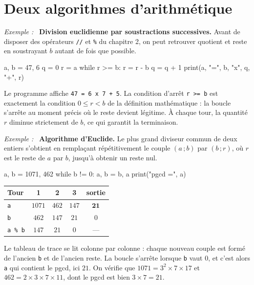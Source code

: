 \documentclass[a4paper,11pt,openany]{book}
\newcommand{\code}[1]{\texttt{\textcolor{codebleu}{#1}}}
\newenvironment{exemple}%
 {\par\vspace{1mm}\begin{list}{}{\leftmargin=1cm \rightmargin=0.5cm}\item[]%
  \textit{Exemple :}~}%
 {\end{list}\vspace{1mm}}
\renewcommand{\arraystretch}{1.4}
\begin{document}
\section{Deux algorithmes d'arithmétique}

\begin{exemple}
\textbf{Division euclidienne par soustractions successives.} Avant de disposer des opérateurs \code{//} et \code{\%} du chapitre 2, on peut retrouver quotient et reste en soustrayant $b$ autant de fois que possible.
\begin{python}
a, b = 47, 6
q = 0
r = a
while r >= b:
    r = r - b
    q = q + 1
print(a, "=", b, "x", q, "+", r)
\end{python}
Le programme affiche \code{47 = 6 x 7 + 5}. La condition d'arrêt \code{r >= b} est exactement la condition $0 \leqslant r < b$ de la définition mathématique : la boucle s'arrête au moment précis où le reste devient légitime. À chaque tour, la quantité $r$ diminue strictement de $b$, ce qui garantit la terminaison.
\end{exemple}

\begin{exemple}
\textbf{Algorithme d'Euclide.} Le plus grand diviseur commun de deux entiers s'obtient en remplaçant répétitivement le couple $(a\,;b)$ par $(b\,;r)$, où $r$ est le reste de $a$ par $b$, jusqu'à obtenir un reste nul.
\begin{python}
a, b = 1071, 462
while b != 0:
    a, b = b, a %
print("pgcd =", a)
\end{python}
\end{exemple}

\begin{center}
\renewcommand{\arraystretch}{1.4}
\begin{tabular}{|l|c|c|c|c|}
\hline
\rowcolor{orange!50} \textbf{Tour} & 1\up{er} & 2\up{e} & 3\up{e} & sortie \\
\hline
\code{a} & $1071$ & $462$ & $147$ & $\mathbf{21}$ \\
\hline
\code{b} & $462$ & $147$ & $21$ & $0$ \\
\hline
\code{a \% b} & $147$ & $21$ & $0$ & --- \\
\hline
\end{tabular}
\end{center}

Le tableau de trace se lit colonne par colonne : chaque nouveau couple est formé de l'ancien \code{b} et de l'ancien reste. La boucle s'arrête lorsque \code{b} vaut $0$, et c'est alors \code{a} qui contient le pgcd, ici $21$. On vérifie que $1071 = 3^2 \times 7 \times 17$ et $462 = 2 \times 3 \times 7 \times 11$, dont le pgcd est bien $3 \times 7 = 21$.
\end{document}

